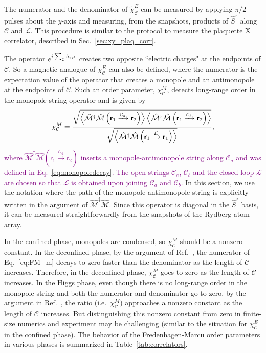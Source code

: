 \documentclass[twocolumn,superscriptaddress,amsmath,amssymb,aps,prx,nofootinbib]{revtex4-2}
\newcommand{\dual}[1]{\boldsymbol{\mathsf{#1}}}
\newcommand{\newtext}[1]{\textcolor{purple}{#1}}
\begin{document}
The numerator and the denominator of $\tilde{\chi}_\mathcal{C}^E$ can be measured by applying $\pi/2$ pulses about the $y$-axis and measuring, from the snapshots, products of $\hat{S}^z$ along $\mathcal{C}$ and $\mathcal{L}$. This procedure is similar to the protocol to measure the plaquette X correlator, described in Sec.~\ref{sec:xy_plaq_corr}. 

The operator $e^{i \sum_{\mathcal{C}} \hat{a}_{\vb{r} \vb{r}'}}$ creates two opposite ``electric charges" at the endpoints of $\mathcal{C}$. So a magnetic analogue of $\chi^E_\mathcal{C}$ can also be defined, where the  numerator is the expectation value of the operator that creates a monopole and an antimonopole at the endpoints of $\mathcal{C}$. Such an order parameter, $\chi_{\mathcal{C}}^M$, detects long-range order in the monopole string operator and is given by
\newtext{
\begin{equation}\label{eq:FM_m}
  \chi_{\mathcal{C}}^M = \frac{\sqrt{\expval{ \hat{\mathcal{M}}^{\dagger} \hat{\mathcal{M}}\left(\dual{r}_1 \xrightarrow{\mathcal{C}_a} \dual{r}_2\right) }\expval{ \hat{\mathcal{M}}^{\dagger} \hat{\mathcal{M}}\left(\dual{r}_1 \xrightarrow{\mathcal{C}_b} \dual{r}_2\right) }} }{  \sqrt{\expval{ \hat{\mathcal{M}}^{\dagger} \hat{\mathcal{M}}\left(\dual{r}_1 \xrightarrow{\mathcal{L}} \dual{r}_1\right)}}  },
\end{equation}
where $\hat{\mathcal{M}}^\dagger \hat{\mathcal{M}} (\dual{r}_1 \xrightarrow{\mathcal{C}_a} \dual{r}_2)$ inserts a monopole-antimonopole string along $\mathcal{C}_a$ and was defined in Eq.~\eqref{eq:monopoledecay}. The open strings $\mathcal{C}_a$, $\mathcal{C}_b$ and the closed loop $\mathcal{L}$ are chosen so that $\mathcal{L}$ is obtained upon joining $\mathcal{C}_a$ and $\mathcal{C}_b$.} In this section, we use the notation where the path of the monopole-antimonopole string is explicitly written in the argument of $\hat{\mathcal{M}}^\dagger \hat{\mathcal{M}}$. 
Since this operator is diagonal in the $\hat{S}^z$ basis, it can be measured straightforwardly from the snapshots of the Rydberg-atom array.

In the confined phase, monopoles are condensed, so $\chi_{\mathcal{C}}^M$ should be a nonzero constant. In the deconfined phase, by the argument of Ref.~\cite{fredenhagen1986}, the numerator of Eq.~\eqref{eq:FM_m} decays to zero faster than the denominator as the length of $\mathcal{C}$ increases. Therefore, in the deconfined phase, $\chi_{\mathcal{C}}^M$ goes to zero as the length of $\mathcal{C}$ increases. In the Higgs phase, even though there is no long-range order in the monopole string and both the numerator and denominator go to zero, by the argument in Ref.~\cite{fredenhagen1986}, the ratio (i.e.~$\chi_{\mathcal{C}}^M$) approaches a nonzero constant as the length of $\mathcal{C}$ increases. But distinguishing this nonzero constant from zero in finite-size numerics and experiment may be challenging (similar to the situation for $\chi_{\mathcal{C}}^E$ in the confined phase). The behavior of the Fredenhagen-Marcu order parameters in various phases is summarized in Table~\ref{tab:correlators}.
\end{document}
